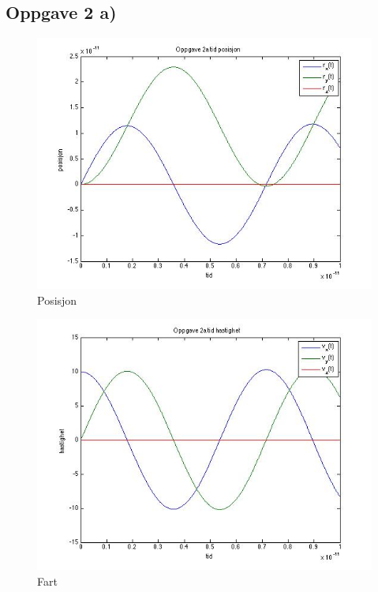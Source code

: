 \documentclass[12pt,a4paper,final,leqno]{report}
\begin{document}
\subsection*{Oppgave 2 a)}
\begin{figure}[H]
\caption{Posisjon}
\centering
\includegraphics[width=\textwidth]{oppgave2rt.jpg}
\end{figure}
\begin{figure}[H]
\caption{Fart}
\centering
\includegraphics[width=\textwidth]{oppgave2vt.jpg}
\end{figure}
\end{document}
